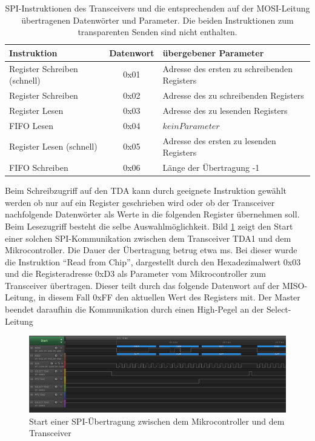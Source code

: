 \begin{table}[tbh]
	\centering
	\begin{tabular}{lcl}
		
		Instruktion & Datenwort & übergebener Parameter  \\
		\hline
		Register Schreiben (schnell) & 0x01 & Adresse des ersten zu schreibenden Registers   \\
		Register Schreiben & 0x02 & Adresse des zu schreibenden Registers   \\  
		Register Lesen & 0x03 & Adresse des zu lesenden Registers   \\  
		FIFO Lesen & 0x04 &  $kein Parameter$ \\  
		Register Lesen (schnell) & 0x05 & Adresse des ersten zu lesenden Registers   \\  
		FIFO Schreiben & 0x06 & Länge der Übertragung -1   \\  
	\end{tabular}
	\caption{SPI-Instruktionen des Transceivers und die entsprechenden auf der MOSI-Leitung übertragenen Datenwörter und Parameter. Die beiden Instruktionen zum transparenten Senden sind nicht enthalten. }
	\label{tab:SPIcommands}
\end{table}







Beim Schreibzugriff auf den TDA kann durch geeignete Instruktion gewählt werden ob nur auf ein Register geschrieben wird oder ob der Transceiver nachfolgende Datenwörter als Werte in die folgenden Register übernehmen soll. 
Beim Lesezugriff besteht die selbe Auswahlmöglichkeit. Bild \ref{fig:spistart} zeigt den Start einer solchen \ac{SPI}-Kommunikation zwischen dem Transceiver TDA1 und dem Mikrocontroller. Die Dauer der Übertragung betrug etwa \unit[0,26]{ms}. Bei dieser wurde die Instruktion \enquote{Read from Chip}, dargestellt durch den Hexadezimalwert 0x03 und die Registeradresse 0xD3 als Parameter vom Mikrocontroller zum Transceiver übertragen. Dieser teilt durch das folgende Datenwort auf der \ac{MISO}-Leitung, in diesem Fall 0xFF den aktuellen Wert des Registers mit. Der Master beendet daraufhin die Kommunikation durch einen High-Pegel an der Select-Leitung


\begin{figure}[h]
\centering
\includegraphics[width=\linewidth,trim=0cm 2.9cm 4.5cm 0cm,clip=true]{"Abbildungen/Aufnahmen/Bilder/Logic Analyser/SPI_Start"}
\caption{Start einer SPI-Übertragung zwischen dem Mikrocontroller und dem Transceiver}
\label{fig:spistart}
\end{figure}


